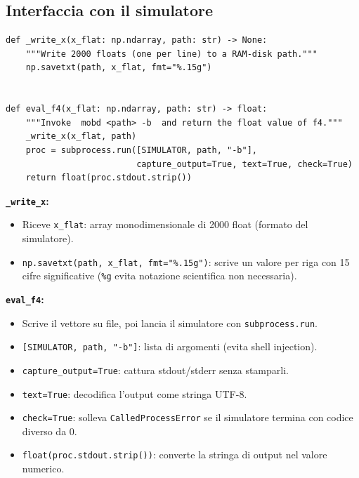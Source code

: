 \documentclass[12pt,a4paper]{article}
\theoremstyle{definition}
\begin{document}
\subsection{Interfaccia con il simulatore}

\begin{lstlisting}[caption={Righe 68–78 — Scrittura file e chiamata al simulatore}]
def _write_x(x_flat: np.ndarray, path: str) -> None:
    """Write 2000 floats (one per line) to a RAM-disk path."""
    np.savetxt(path, x_flat, fmt="%.15g")


def eval_f4(x_flat: np.ndarray, path: str) -> float:
    """Invoke  mobd <path> -b  and return the float value of f4."""
    _write_x(x_flat, path)
    proc = subprocess.run([SIMULATOR, path, "-b"],
                          capture_output=True, text=True, check=True)
    return float(proc.stdout.strip())
\end{lstlisting}

\textbf{\texttt{\_write\_x}:}
\begin{itemize}[nosep]
  \item Riceve \texttt{x\_flat}: array monodimensionale di 2000 float (formato del simulatore).
  \item \texttt{np.savetxt(path, x\_flat, fmt="\%.15g")}: scrive un valore per riga con 15
        cifre significative (\texttt{\%g} evita notazione scientifica non necessaria).
\end{itemize}

\textbf{\texttt{eval\_f4}:}
\begin{itemize}[nosep]
  \item Scrive il vettore su file, poi lancia il simulatore con \texttt{subprocess.run}.
  \item \texttt{[SIMULATOR, path, "-b"]}: lista di argomenti (evita shell injection).
  \item \texttt{capture\_output=True}: cattura stdout/stderr senza stamparli.
  \item \texttt{text=True}: decodifica l'output come stringa UTF-8.
  \item \texttt{check=True}: solleva \texttt{CalledProcessError} se il simulatore termina
        con codice diverso da 0.
  \item \texttt{float(proc.stdout.strip())}: converte la stringa di output nel valore numerico.
\end{itemize}
\end{document}
